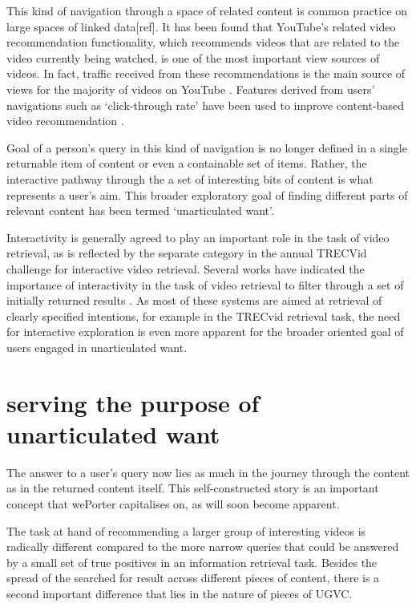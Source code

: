 This kind of navigation through a space of related content is common practice on large spaces of linked data[ref]. It has been found that YouTube's related video recommendation functionality, which recommends videos that are related to the video currently being watched, is one of the most important view sources of videos. In fact, traffic received from these recommendations is the main source of views for the majority of videos on YouTube \cite{Zhou:2010ut}. Features derived from users' navigations such as `click-through rate' have been used to improve content-based video recommendation \cite{Yang:2007vb}.

Goal of a person's query in this kind of navigation is no longer defined in a single returnable item of content or even a containable set of items. Rather, the interactive pathway through the a set of interesting bits of content is what represents a user's aim. This broader exploratory goal of finding different parts of relevant content has been termed `unarticulated want'\cite{Davidson:2010tu}.

Interactivity is generally agreed to play an important role in the task of video retrieval, as is reflected by the separate category in the annual TRECVid challenge for interactive video retrieval\cite{Smeaton:2006ww}. Several works have indicated the importance of interactivity in the task of video retrieval to filter through a set of initially returned results \cite{DeRooij:2007ua, Christel:2004wm, DeRooij:2007ua, DeRooij:2008ut}. As most of these systems are aimed at retrieval of clearly specified intentions, for example in the TRECvid retrieval task, the need for interactive exploration is even more apparent for the broader oriented goal of users engaged in unarticulated want.

\section{serving the purpose of unarticulated want}
The answer to a user's query now lies as much in the journey through the content as in the returned content itself. This self-constructed story is an important concept that wePorter capitalises on, as will soon become apparent.

The task at hand of recommending a larger group of interesting videos is radically different compared to the more narrow queries that could be answered by a small set of true positives in an information retrieval task. Besides the spread of the searched for result across different pieces of content, there is a second important difference that lies in the nature of pieces of UGVC.

